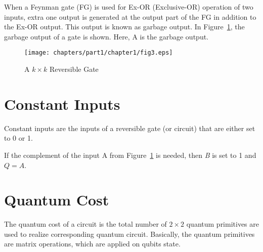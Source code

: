
\begin{example}\textnormal{
When a Feynman gate (FG) is used for Ex-OR (Exclusive-OR) operation of two inputs, extra one output is generated at the output part of the FG in addition to the Ex-OR output. This  output is known as garbage output. In Figure~\ref{fig:p1_c1_fig3}, the garbage output of a gate is shown. Here, A is the garbage output.}
\end{example}

\begin{figure}[H]
\centering
\texttt{[image: chapters/part1/chapter1/fig3.eps]}
\caption{A $k \times k$ Reversible Gate}
\label{fig:p1_c1_fig3}
\end{figure}

\section{Constant Inputs}
Constant inputs are the inputs of a reversible gate (or circuit) that are either set to 0 or 1.

\begin{example}\textnormal{
If the complement of the input A from Figure~\ref{fig:p1_c1_fig3} is needed, then \textit{B} is set to 1 and $Q = A$.}
\end{example}

\section{Quantum Cost}

The quantum cost of a circuit is the total number of $2 \times 2$ quantum primitives are used to realize corresponding quantum circuit. Basically, the quantum primitives are matrix operations, which are applied on qubits state.%



